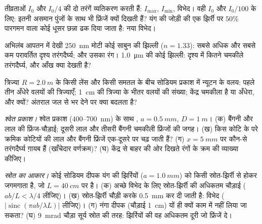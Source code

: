 \begin{exercise}[$\star$]\label{exo:b2:two-wave-interference:2}
तीव्रताओं $I_0$ और $I_0/4$ की दो तरंगें व्यतिकरण करती हैं: $I_{\max}$, $I_{\min}$,
विभेद। वही $I_0$ और $I_0/100$ के लिए: इतनी असमान पुंजों के साथ भी फ्रिंजें
क्यों दिखती हैं? यंग की जोड़ी की एक झिर्री पर $50\%$ पारगमन वाला
कोई धूसर छन्ना ढक दिया जाता है: नया विभेद।
\end{exercise}

\begin{exercise}[$\star$]\label{exo:b2:two-wave-interference:3}
अभिलंब आपतन में देखी \qty{250}{nm} मोटी कोई साबुन की झिल्ली ($n = 1.33$):
सबसे अधिक और सबसे कम परावर्तित दृश्य तरंगदैर्घ्य; और उसका रंग। \qty{1.0}{\micro m}
की कोई झिल्ली: दृश्य में कितने चमकीले तरंगदैर्घ्य, और
आँख क्या देखती है?
\end{exercise}

\begin{exercise}[$\star$]\label{exo:b2:two-wave-interference:4}
त्रिज्या $R = \qty{2.0}{m}$ के किसी लेंस और किसी समतल के बीच सोडियम प्रकाश में
न्यूटन के वलय: पहले तीन अँधेरे वलयों की त्रिज्याएँ; \qty{1}{cm} की त्रिज्या
के भीतर वलयों की संख्या; केंद्र चमकीला है या अँधेरा, और क्यों?
अंतराल जल से भर देने पर क्या बदलता है?
\end{exercise}

\begin{exercise}[$\star\star$]\label{exo:b2:two-wave-interference:5}
\emph{श्वेत प्रकाश।} श्वेत प्रकाश ($400$--\qty{700}{nm}) के साथ ,
$a = \qty{0.5}{mm}$, $D = \qty{1}{m}$। (क) बैंगनी और लाल की फ्रिंज-चौड़ाई;
दूसरी लाल और तीसरी बैंगनी चमकीली फ्रिंजों की जगह। (ख)
किस कोटि के परे क्रमिक कोटियों की लाल और बैंगनी फ्रिंजें
एक-दूसरे पर चढ़ जाती हैं? (ग) $x = \qty{5}{mm}$ पर कौन-से तरंगदैर्घ्य ग़ायब हैं
(खाँचेदार वर्णक्रम)? (घ) केंद्र से बाहर की ओर दिखते रंगों के क्रम की
व्याख्या कीजिए।
\end{exercise}

\begin{exercise}[$\star\star$]\label{exo:b2:two-wave-interference:6}
\emph{स्रोत का आकार।} कोई सोडियम दीपक यंग की झिर्रियों ($a = \qty{1.0}{mm}$) को
किसी स्रोत-झिर्री से होकर जगमगाता है, जो $L = \qty{40}{cm}$ पर है। (क) अच्छे विभेद के लिए
स्रोत-झिर्री की अधिकतम चौड़ाई ($ab/L < \lambda/4$ लीजिए)। (ख) स्रोत-झिर्री
चौड़ी करके \qty{0.5}{mm} कर दी जाती है: विभेद ($|\operatorname{sinc}(\pi ab/\lambda L)|$ लीजिए)।
(ग) नंगा दीपक (चौड़ाई \qty{1}{cm}) यों ही क्यों काम में नहीं लिया जा सकता? (घ)
\qty{9}{mrad} चौड़ा सूर्य स्रोत की तरह: झिर्रियों की वह अधिकतम दूरी जो
फ्रिंजें दे।
\end{exercise}

